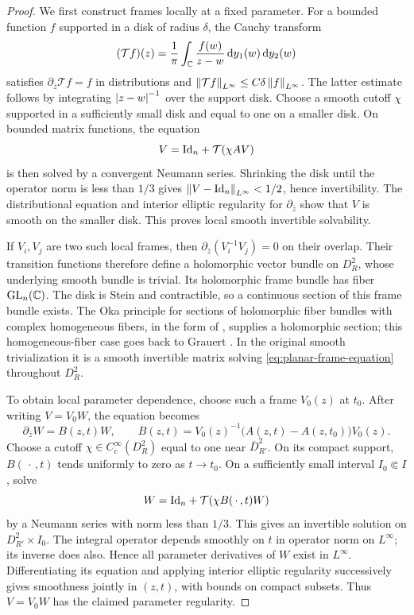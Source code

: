 \begin{proof}
We first construct frames locally at a fixed parameter. For a
bounded function $f$ supported in a disk of radius $\delta$, the
Cauchy transform
\[
 (\mathcal Tf)(z)=\frac1\pi
       \int_{\mathbb C}\frac{f(w)}{z-w}\,\mathrm d y_1(w)\,\mathrm d y_2(w)
\]
satisfies $\partial_{\overline z}\mathcal Tf=f$ in distributions
and $\left\lVert \mathcal Tf\right\rVert_{L^\infty}\le C\delta\left\lVert f\right\rVert_{L^\infty}$.
The latter estimate follows by integrating $\left\lvert z-w\right\rvert^{-1}$ over
the support disk. Choose a smooth cutoff $\chi$ supported in a
sufficiently small disk and equal to one on a smaller disk. On
bounded matrix functions, the equation
\[
 V=\mathrm{Id}_n+\mathcal T(\chi A V)
\]
is then solved by a convergent Neumann series. Shrinking the disk
until the operator norm is less than $1/3$ gives
$\left\lVert V-\mathrm{Id}_n\right\rVert_{L^\infty}<1/2$, hence invertibility. The
distributional equation and interior elliptic regularity for
$\partial_{\overline z}$ show that $V$ is smooth on the smaller
disk. This proves local smooth invertible solvability.

If $V_i,V_j$ are two such local frames, then
$\partial_{\overline z}(V_i^{-1}V_j)=0$ on their overlap.
Their transition functions therefore define a holomorphic vector
bundle on $D_R^2$, whose underlying smooth bundle is trivial.
Its holomorphic frame bundle has fiber $\mathrm{GL}_n(\mathbb C)$.
The disk is Stein and contractible, so a continuous section of
this frame bundle exists. The Oka principle for sections of holomorphic
fiber bundles with complex homogeneous fibers, in the form of
\cite[Theorem~1.1, p.~1018]{Forstneric2009}, supplies a holomorphic
section; this homogeneous-fiber case goes back to Grauert
\cite{Grauert1958}. In the original smooth trivialization it is
a smooth invertible matrix solving
\eqref{eq:planar-frame-equation} throughout $D_R^2$.

To obtain local parameter dependence, choose such a frame $V_0(z)$
at $t_0$. After writing $V=V_0W$, the equation becomes
\[
 \partial_{\overline z}W=B(z,t)W,
 \qquad
 B(z,t)=V_0(z)^{-1}\bigl(A(z,t)-A(z,t_0)\bigr)V_0(z).
\]
Choose a cutoff $\chi\in C_c^\infty(D_R^2)$ equal to one near
$\overline D_{R'}^2$. On its compact support, $B(\,\cdot\,,t)$
tends uniformly to zero as $t\to t_0$. On a sufficiently small
interval $I_0\Subset I$, solve
\[
 W=\mathrm{Id}_n+\mathcal T(\chi B(\,\cdot\,,t)W)
\]
by a Neumann series with norm less than $1/3$. This gives an
invertible solution on $D_{R'}^2\times I_0$. The integral operator
depends smoothly on $t$ in operator norm on $L^\infty$; its
inverse does also. Hence all parameter derivatives of $W$ exist
in $L^\infty$. Differentiating its equation and applying interior
elliptic regularity successively gives smoothness jointly in
$(z,t)$, with bounds on compact subsets. Thus $V=V_0W$ has the
claimed parameter regularity.


\end{proof}
